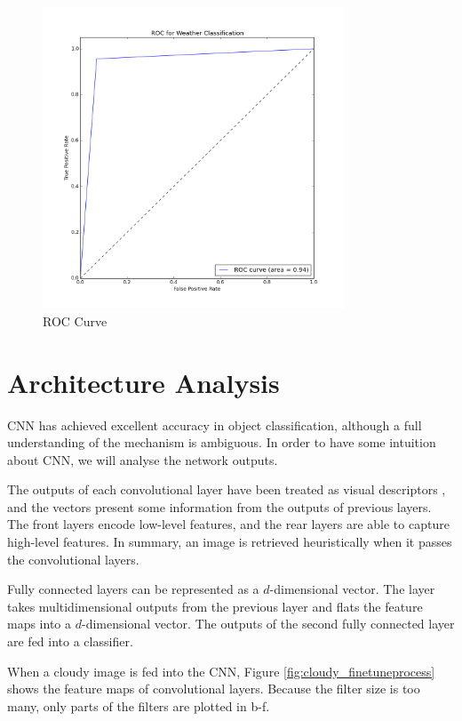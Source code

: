 \begin{figure}[!htb]
    \centering
	\includegraphics[width=0.8\textwidth]{ROCWeatherClassification.png}
    \caption{ROC Curve}%
    \label{fig:WeatherClassificationROC}%
\end{figure}

\section{Architecture Analysis}

CNN has achieved excellent accuracy in object classification, although a full understanding of the mechanism is ambiguous. In order to have some intuition about CNN, we will analyse the network outputs.

The outputs of each convolutional layer have been treated as visual descriptors \citep{razavian2014cnn}, and the vectors present some information from the outputs of previous layers. The front layers encode low-level features, and the rear layers are able to capture high-level features. In summary, an image is retrieved heuristically when it passes the convolutional layers.

Fully connected layers can be represented as a $d$-dimensional vector. The layer takes multidimensional outputs from the previous layer and flats the feature maps into a $d$-dimensional vector. The outputs of the second fully connected layer are fed into a classifier.

When a cloudy image is fed into the CNN, Figure \ref{fig:cloudy_finetuneprocess} shows the feature maps of convolutional layers. Because the filter size is too many, only parts of the filters are plotted in b-f.

